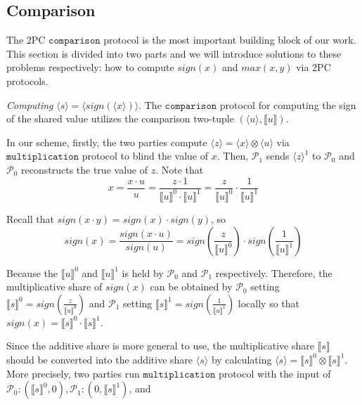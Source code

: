 \documentclass[letterpaper]{article} %
\begin{document}
    \subsection{Comparison}
    The 2PC $\mathtt{comparison}$ protocol is the most important building block of our work.
    This section is divided into two parts and we will introduce solutions to these problems respectively: 
    how to compute $sign(x)$ and $max(x,y)$ via 2PC protocols.
    
    \emph{Computing} $\langle s\rangle  = \langle sign(\langle x\rangle)\rangle $. 
    The $\mathtt{comparison}$ protocol for computing the sign of the shared value utilizes the comparison two-tuple $(\langle u\rangle,\llbracket u \rrbracket )$.
    
    In our scheme, firstly, the two parties compute $ \langle z\rangle = \langle x\rangle\otimes \langle u\rangle$ via $\mathtt{multiplication}$ protocol
    to blind the value of $x$.
    Then, $\mathcal{P}_{1}$ sends  $ \langle z\rangle^{1}$ to $\mathcal{P}_{0}$ and 
    $\mathcal{P}_{0}$ reconstructs the true value of $z$.
    Note that 
    $$x=\frac{x\cdot u}{u} 
        =\frac{z\cdot 1}{\llbracket u \rrbracket^{0}\cdot \llbracket u \rrbracket^{1}}
        =\frac{z}{\llbracket u \rrbracket^{0}}\cdot\frac{1}{\llbracket u \rrbracket^{1}}$$

    Recall that $sign(x\cdot y)=sign(x)\cdot sign(y)$, so
    $$sign(x)=\frac{sign(x \cdot u)}{sign(u)}
    =sign(\frac{z}{\llbracket u \rrbracket^{0}})
    \cdot sign(\frac{1}{\llbracket u \rrbracket^{1}})$$
    
    
    
    Because the $\llbracket u \rrbracket^{0}$ and $\llbracket u \rrbracket^{1}$
    is held by $\mathcal{P}_{0}$ and $\mathcal{P}_{1}$ respectively.
    Therefore, the multiplicative share of $sign(x)$ can be obtained by
    $\mathcal{P}_{0}$ setting $\llbracket s \rrbracket^{0}
    =sign(\frac{z}{\llbracket u \rrbracket^{0}})$
    and $\mathcal{P}_{1}$ setting $\llbracket s \rrbracket^{1}
    =sign(\frac{1}{\llbracket u \rrbracket^{1}})$ locally
    so that $sign(x)=\llbracket s \rrbracket^{0}\cdot \llbracket s \rrbracket^{1}$.

    Since the additive share is more general to use, 
    the multiplicative share $\llbracket s \rrbracket$ should be converted into the additive share $\langle s\rangle$
    by calculating $\langle s\rangle = \llbracket s \rrbracket ^{0}\otimes \llbracket s \rrbracket ^{1}$.
    More precisely, two parties run $\mathtt{multiplication}$ protocol with the input of 
    $\mathcal{P}_{0}:(\llbracket s \rrbracket ^{0},0),\mathcal{P}_{1}:(0,\llbracket s \rrbracket ^{1})$, and 
\end{document}
